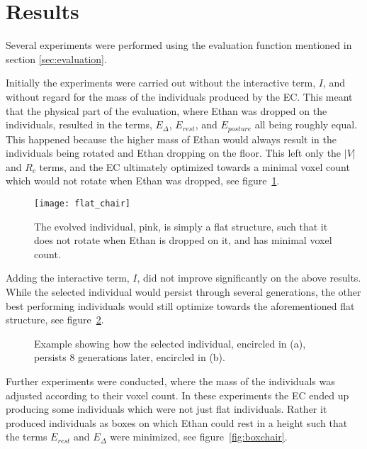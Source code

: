 \section{Results} Several experiments were performed using the evaluation
function mentioned in section \ref{sec:evaluation}. 

Initially the experiments were carried out without the interactive term, $I$,
and without regard for the mass of the individuals produced by the EC. This
meant that the physical part of the evaluation, where Ethan was dropped on the
individuals, resulted in the terms, $E_\Delta$, $E_{rest}$, and $E_{posture}$
all being roughly equal. This happened because the higher mass of Ethan would
always result in the individuals being rotated and Ethan dropping on the floor.
This left only the $|V|$ and $R_c$ terms, and the EC ultimately optimized
towards a minimal voxel count which would not rotate when Ethan was dropped, see
figure~\ref{fig:flat_object}.

\begin{figure}[ht]
\centering
\texttt{[image: flat\_chair]}
\caption{The evolved individual, pink, is simply a flat structure, such that
it does not rotate when Ethan is dropped on it, and has minimal voxel
count.} \label{fig:flat_object} \end{figure}

Adding the interactive term, $I$, did not improve significantly on the above
results. While the selected individual would persist through several
generations, the other best performing individuals would still optimize towards
the aforementioned flat structure, see figure~\ref{fig:selection}.
\begin{figure}[ht]
	\centering
	 \hfil
	\caption{Example showing how the selected individual, encircled in (a),
	persists 8 generations later, encircled in (b).} \label{fig:selection}
\end{figure}

Further experiments were conducted, where the mass of the individuals was
adjusted according to their voxel count. In these experiments the EC ended up
producing some individuals which were not just flat individuals. Rather it produced
individuals as boxes on which Ethan could rest in a height such that the terms
$E_{rest}$ and $E_\Delta$ were minimized, see figure~\ref{fig:boxchair}.

